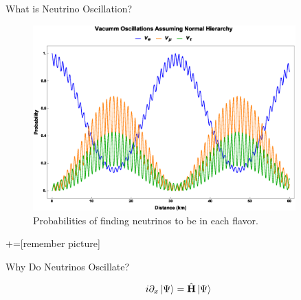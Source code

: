 \documentclass[9pt]{beamer}
\begin{document}
\begin{darkframes}
\begin{frame}{What is Neutrino Oscillation?}
{\begin{tcolorbox}
\begin{figure}
    \centering
    \includegraphics[width=0.9\textwidth]{assets/vacuum-oscillations-3-flavor}
    \caption*{\color{black}Probabilities of finding neutrinos to be in each flavor.}
\end{figure}
\end{tcolorbox}

}




\end{frame}




+=[remember picture]

\everymath{\displaystyle}


\begin{frame}[fragile]{Why Do Neutrinos Oscillate?}

\begin{tcolorbox}[title=Equation of Motion]

\begin{equation*}
i\partial_x \left| \Psi\right\rangle = \hat {\mathbf H} \left| \Psi\right\rangle
\end{equation*}


\end{tcolorbox}
\end{frame}
\end{darkframes}
\end{document}
